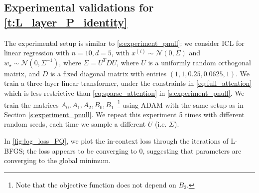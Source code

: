 \documentclass{article}
\newcommand{\wstar}{w_\star}
\newcommand{\tx}[1]{x^{(#1)}}
\begin{document}
\subsection{Experimental validations for \autoref{t:L_layer_P_identity}}
\label{s:experiment_PQ}
The experimental setup is similar to \autoref{s:experiment_pnull}: we consider ICL for linear regression with $n=10,d=5$, with $\tx{i}\sim \mathcal{N}(0,\Sigma)$ and $\wstar \sim \mathcal{N}(0,\Sigma^{-1})$, where $\Sigma = U^T D U$, where $U$ is a uniformly random orthogonal matrix, and $D$ is a fixed diagonal matrix with entries $(1,1,0.25,0.0625,1)$. We train a three-layer linear transformer, under the constraints in \eqref{eq:full_attention} which is less restrictive than \eqref{eq:sparse_attention} in \autoref{s:experiment_pnull}. We train the matrices $A_0,A_1,A_2, B_0, B_1$~\footnote{Note that the objective function does not depend on $B_2$.} using ADAM with the same setup as in Section \autoref{s:experiment_pnull}. We repeat this experiment 5 times with different random seeds, each time we sample a different $U$ (i.e. $\Sigma$).

In \autoref{fig:log_loss_PQ}, we plot the in-context loss through the iterations of L-BFGS; the loss appears to be converging to 0, suggesting that parameters are converging to the global minimum. 
\end{document}
